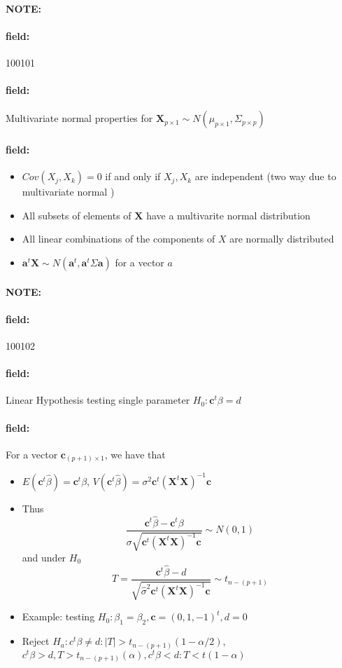 \documentclass[12pt]{article}
\newenvironment{note}{\paragraph{NOTE:}}{}
\newenvironment{field}{\paragraph{field:}}{}
\begin{document}
\begin{note} \begin{field} \tiny 100101 \end{field}
 \begin{field}
  Multivariate normal properties for $\mathbf{X}_{p \times 1} \sim N(\mu_{p\times 1}, \Sigma_{p \times p})$
 \end{field}
 \begin{field}
  \begin{itemize}
   \item $Cov(X_j,X_k) = 0$ if and only if $X_j,X_k$ are independent (two way due to multivariate normal )
   \item All subsets of elements of $\mathbf{X}$ have a multivarite normal distribution
   \item All linear combinations of the components of $X$ are normally distributed
   \item $\mathbf{a}^t \mathbf{X} \sim N(\mathbf{a}^t, \mathbf{a}^t \Sigma \mathbf{a})$ for a vector $a$
  \end{itemize}
 \end{field}
\end{note}


\begin{note} \begin{field} \tiny 100102 \end{field}
 \begin{field}
  Linear Hypothesis testing single parameter $H_0: \mathbf{c}^t \beta = d$
 \end{field}
 \begin{field}
  For a vector $\mathbf{c}_{(p+1)\times 1}$, we have that
  \begin{itemize}
   \item $E(\textbf{c}^t\hat{\beta}) = \mathbf{c}^t \beta$, $V(\mathbf{c}^t \hat{\beta}) = \sigma^2 \mathbf{c}^t (\mathbf{X}^t \mathbf{X})^{-1} \mathbf{c}$
   \item Thus $$ \frac{\mathbf{c}^t \hat{\beta} - \mathbf{c}^t \beta }{\sigma \sqrt{\mathbf{c}^t(\mathbf{X}^t \mathbf{X})^{-1} \mathbf{c}}} \sim N(0,1)$$ and under $H_0$
         $$ T = \frac{\mathbf{c}^t \hat{\beta} - d}{ \sqrt{\hat{\sigma}^2\mathbf{c}^t(\mathbf{X}^t \mathbf{X})^{-1} \mathbf{c}}} \sim t_{n - (p+1)}$$
   \item Example: testing $H_0: \beta_1 = \beta_2, \mathbf{c} = (0,1,-1)^t, d = 0$
   \item Reject $H_a: c^t \beta \neq d:  |T| > t_{n - (p+1)}(1-\alpha/2)$, $c^t \beta > d, T > t_{n-(p+1)}(\alpha), c^t\beta < d: T < t(1 - \alpha)$
  \end{itemize}
 \end{field}
\end{note}
\end{document}
